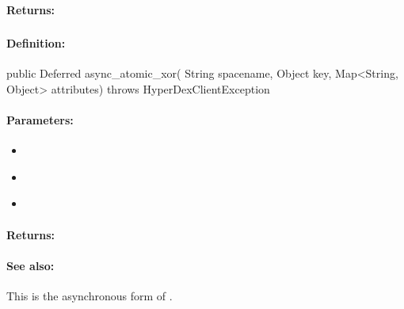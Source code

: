 \paragraph{Returns:}


\pagebreak
\subsubsection{}
\label{api:java:async_atomic_xor}


\paragraph{Definition:}
\begin{javacode}
public Deferred async_atomic_xor(
        String spacename,
        Object key,
        Map<String, Object> attributes) throws HyperDexClientException
\end{javacode}

\paragraph{Parameters:}
\begin{itemize}[noitemsep]
\item {}\\

\item {}\\

\item {}\\

\end{itemize}

\paragraph{Returns:}


\paragraph{See also:}  This is the asynchronous form of .

\pagebreak

